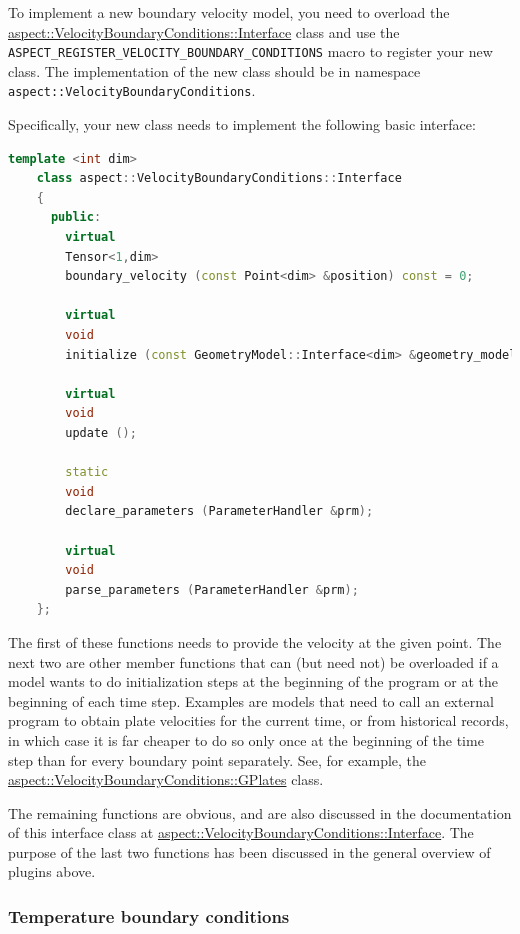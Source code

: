 \documentclass{article}
\begin{document}
To implement a new boundary velocity model, you
need to overload the
\href{doc/doxygen/classaspect_1_1VelocityBoundaryConditions_1_1Interface.html}{aspect::VelocityBoundaryConditions::Interface}
class and use
the \texttt{ASPECT\_REGISTER\_VELOCITY\_BOUNDARY\_CONDITIONS} macro to
register your new class. The implementation of the new class should be in namespace
\texttt{aspect::VelocityBoundaryConditions}.

Specifically, your new class needs to implement the following basic interface:
\begin{lstlisting}[frame=single,language=C++]
    template <int dim>
    class aspect::VelocityBoundaryConditions::Interface
    {
      public:
        virtual
        Tensor<1,dim>
        boundary_velocity (const Point<dim> &position) const = 0;

        virtual
        void
        initialize (const GeometryModel::Interface<dim> &geometry_model);

        virtual
        void
        update ();

        static
        void
        declare_parameters (ParameterHandler &prm);

        virtual
        void
        parse_parameters (ParameterHandler &prm);
    };
\end{lstlisting}
The first of these functions needs to provide the velocity at the
given point. The next two are other member functions that can
(but need not) be overloaded if a model wants to do initialization steps at the
beginning of the program or at the beginning of each time step. Examples are
models that need to call an external program to obtain plate velocities for the
current time, or from historical records, in which case it is far cheaper to do
so only once at the beginning of the time step than for every boundary point
separately. See, for example, the
\href{doc/doxygen/classaspect_1_1VelocityBoundaryConditions_1_1GPlates.html}{aspect::VelocityBoundaryConditions::GPlates}
class.

The remaining functions are obvious, and are also
discussed in the documentation of this interface class at
\href{doc/doxygen/classaspect_1_1VelocityBoundaryConditions_1_1Interface.html}{aspect::VelocityBoundaryConditions::Interface}.
The purpose
of the last two functions has been discussed in the general overview of
plugins above.


\subsubsection{Temperature boundary conditions}
\label{sec:temperature-boundary-conditions}
\end{document}
